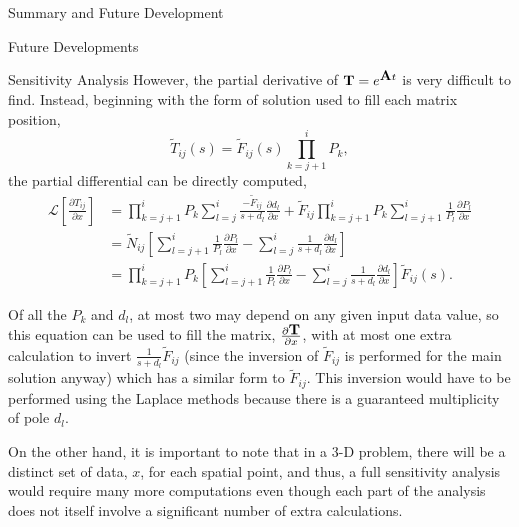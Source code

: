 \begin{chapter}{Summary and Future Development}
\begin{section}{Future Developments}
\begin{subsection}{Sensitivity Analysis}
      However, the partial derivative of $\mbox{$\mathbf{T}$} = e^{\mbox{$\mathbf{A}$}t}$ is
      very difficult to find.  Instead, beginning with the form of
      solution used to fill each matrix position,
      \begin{equation}
        \tilde{T}_{ij}(s) = \tilde{F}_{ij}(s) \prod_{k=j+1}^i P_k,
      \end{equation}
      the partial differential can be directly computed,
      \begin{equation}
        \begin{split}
          \mathcal{L}\left[ \frac{\partial T_{ij}}{\partial x} \right ]
          &= \prod_{k=j+1}^i P_k \sum_{l=j}^i
          \frac{-\tilde{F}_{ij}}{s+d_l}\frac{\partial d_l}{\partial x}
          + \tilde{F}_{ij} \prod_{k=j+1}^i P_k \sum_{l=j+1}^i \frac{1}{P_l}\frac{\partial P_l}{\partial x} \\
          &= \tilde{N}_{ij} \left [ \sum_{l=j+1}^i
            \frac{1}{P_l}\frac{\partial P_l}{\partial x}
            - \sum_{l=j}^i \frac{1}{s+d_l}\frac{\partial d_l}{\partial x} \right ] \\
          & = \prod_{k=j+1}^i P_k \left [ \sum_{l=j+1}^i
            \frac{1}{P_l}\frac{\partial P_l}{\partial x} - \sum_{l=j}^i
            \frac{1}{s+d_l}\frac{\partial d_l}{\partial x} \right ]
          \tilde{F}_{ij}(s).
        \end{split}
      \end{equation}
      
      Of all the $P_k$ and $d_l$, at most two may depend on any given
      input data value, so this equation can be used to fill the
      matrix, $\frac{\partial\mbox{$\mathbf{T}$}}{\partial x}$, with at most one
      extra calculation to invert $\frac{1}{s+d_l}\tilde{F}_{ij}$
      (since the inversion of $\tilde{F}_{ij}$ is performed for the
      main solution anyway) which has a similar form to
      $\tilde{F}_{ij}$.  This inversion would have to be performed
      using the Laplace methods because there is a guaranteed
      multiplicity of pole $d_l$.
      
      On the other hand, it is important to note that in a 3-D problem,
      there will be a distinct set of data, $x$, for each spatial point,
      and thus, a full sensitivity analysis would require many more
      computations even though each part of the analysis does not itself
      involve a significant number of extra calculations.
      
    \end{subsection}


\end{section}
\end{chapter}
